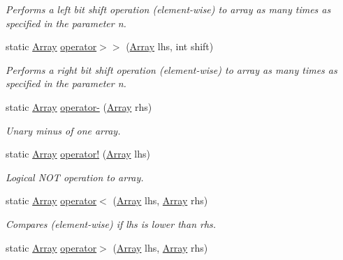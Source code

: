 \begin{DoxyCompactItemize}
\begin{DoxyCompactList}\small\item\em Performs a left bit shift operation (element-\/wise) to array as many times as specified in the parameter n. \end{DoxyCompactList}\item 
static \mbox{\hyperlink{classkhiva_1_1array_1_1_array}{Array}} \mbox{\hyperlink{classkhiva_1_1array_1_1_array_afa54ea024da0e4af55766a1b23f8e10e}{operator$>$$>$}} (\mbox{\hyperlink{classkhiva_1_1array_1_1_array}{Array}} lhs, int shift)
\begin{DoxyCompactList}\small\item\em Performs a right bit shift operation (element-\/wise) to array as many times as specified in the parameter n. \end{DoxyCompactList}\item 
static \mbox{\hyperlink{classkhiva_1_1array_1_1_array}{Array}} \mbox{\hyperlink{classkhiva_1_1array_1_1_array_a617cc526ee701a1f1d6c8f9513a3b3dc}{operator-\/}} (\mbox{\hyperlink{classkhiva_1_1array_1_1_array}{Array}} rhs)
\begin{DoxyCompactList}\small\item\em Unary minus of one array. \end{DoxyCompactList}\item 
static \mbox{\hyperlink{classkhiva_1_1array_1_1_array}{Array}} \mbox{\hyperlink{classkhiva_1_1array_1_1_array_a49651c727023f9b2160bc32265c37394}{operator!}} (\mbox{\hyperlink{classkhiva_1_1array_1_1_array}{Array}} lhs)
\begin{DoxyCompactList}\small\item\em Logical N\+OT operation to array. \end{DoxyCompactList}\item 
static \mbox{\hyperlink{classkhiva_1_1array_1_1_array}{Array}} \mbox{\hyperlink{classkhiva_1_1array_1_1_array_ae1f2d444b7e917810fa703f624ee4b0a}{operator$<$}} (\mbox{\hyperlink{classkhiva_1_1array_1_1_array}{Array}} lhs, \mbox{\hyperlink{classkhiva_1_1array_1_1_array}{Array}} rhs)
\begin{DoxyCompactList}\small\item\em Compares (element-\/wise) if lhs is lower than rhs. \end{DoxyCompactList}\item 
static \mbox{\hyperlink{classkhiva_1_1array_1_1_array}{Array}} \mbox{\hyperlink{classkhiva_1_1array_1_1_array_a63c37c04d800a2360e3bc6a05b4d0fbd}{operator$>$}} (\mbox{\hyperlink{classkhiva_1_1array_1_1_array}{Array}} lhs, \mbox{\hyperlink{classkhiva_1_1array_1_1_array}{Array}} rhs)

\end{DoxyCompactItemize}
